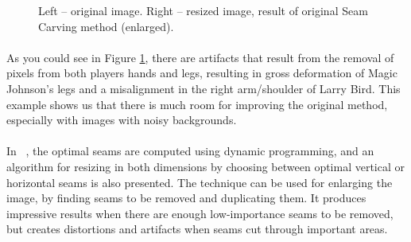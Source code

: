 \documentclass[conference]{acmsiggraph}
\begin{document}
\begin{figure}[ht]       
    \caption{Left -- original image. Right -- resized image, result of original Seam Carving method (enlarged). }
    \label{fig:orgSeamCarving}
\end{figure}

\paragraph{}
 As you could see in Figure \ref{fig:orgSeamCarving}, there are artifacts that result from the removal of  pixels from both players hands and legs, resulting in gross deformation of Magic Johnson's legs and a misalignment in the right arm/shoulder of Larry Bird. This example shows us that there is much room for improving the original method, especially with images with noisy backgrounds.  

\paragraph{}
In  ~\cite{Avidan2007}, the optimal seams are computed using dynamic programming, and an algorithm for resizing in both dimensions by choosing between optimal vertical or horizontal seams is also presented. The technique can be used for enlarging the image, by finding seams to be removed and duplicating them. It produces impressive results when there are enough low-importance seams to be removed, but creates distortions and artifacts when seams cut through important areas.
\end{document}

